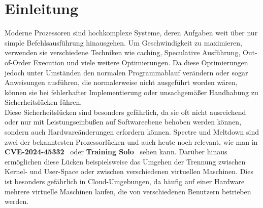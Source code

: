 \section[Einleitung]{Einleitung}
\label{sec:einleitung}

Moderne Prozessoren sind hochkomplexe Systeme, deren Aufgaben weit über nur simple Befehlsausführung hinausgehen.
Um Geschwindigkeit zu maximieren, verwenden sie verschiedene Techniken wie caching, Speculative Ausführung, Out-of-Order Execution und viele weitere Optimierungen.
Da diese Optimierungen jedoch unter Umständen den normalen Programmablauf verändern oder sogar Anweisungen ausführen, die normalerweise nicht ausgeführt worden wären, können sie bei fehlerhafter Implementierung oder unsachgemäßer Handhabung zu Sicherheitslücken führen.\\
Diese Sicherheitslücken sind besonders gefährlich, da sie oft nicht ausreichend oder nur mit Leistungseinbußen auf Softwareebene behoben werden können, sondern auch Hardwareänderungen erfordern können.
Spectre und Meltdown sind zwei der bekanntesten Prozessorlücken und auch heute noch relevant, wie man in \textbf{CVE-2024-45332}~\cite{cve_2024_45332,bprc_sec25} oder \textbf{Training Solo}~\cite{training_solo} sehen kann.
Darüber hinaus ermöglichen diese Lücken beispielsweise das Umgehen der Trennung zwischen Kernel- und User-Space oder zwischen verschiedenen virtuellen Maschinen.
Dies ist besonders gefährlich in Cloud-Umgebungen, da häufig auf einer Hardware mehrere virtuelle Maschinen laufen, die von verschiedenen Benutzern betrieben werden.